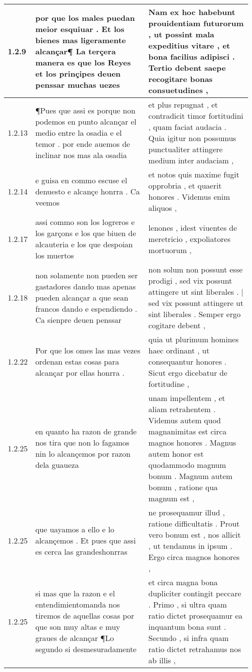 \begin{tabular}{|p{1cm}|p{6.5cm}|p{6.5cm}|}
1.2.9 & por que los males puedan meior esquiuar . Et los bienes mas ligeramente alcançar¶ La terçera manera es que los Reyes et los prinçipes deuen penssar muchas uezes & Nam ex hoc habebunt prouidentiam futurorum , ut possint mala expeditius vitare , et bona facilius adipisci . Tertio debent saepe recogitare bonas consuetudines , \\\hline
1.2.13 & ¶Pues que assi es porque non podemos en punto alcançar el medio entre la osadia e el temor . por ende auemos de inclinar nos mas ala osadia & et plus repugnat , et contradicit timor fortitudini , quam faciat audacia . Quia igitur non possumus punctualiter attingere medium inter audaciam , \\\hline
1.2.14 & e guisa en commo escuse el denuesto e alcançe honrra . Ca veemos & et notos quis maxime fugit opprobria , et quaerit honores . Videmus enim aliquos , \\\hline
1.2.17 & assi commo son los logreros e los garçons e los que biuen de alcauteria e los que despoian los muertos & lenones , idest viuentes de meretricio , expoliatores mortuorum , \\\hline
1.2.18 & non solamente non pueden ser gastadores dando mas apenas pueden alcançar a que sean francos dando e espendiendo . Ca sienpre deuen penssar & non solum non possunt esse prodigi , sed vix possunt attingere ut sint liberales . | sed vix possunt attingere ut sint liberales . Semper ergo cogitare debent , \\\hline
1.2.22 & Por que los omes las mas vezes ordenan estas cosas para alcançar por ellas honrra . & quia ut plurimum homines haec ordinant , ut consequantur honores . Sicut ergo dicebatur de fortitudine , \\\hline
1.2.25 & en quanto ha razon de grande nos tira que non lo fagamos nin lo alcançemos por razon dela guaueza & unam impellentem , et aliam retrahentem . Videmus autem quod magnanimitas est circa magnos honores . Magnus autem honor est quodammodo magnum bonum . Magnum autem bonum , ratione qua magnum est , \\\hline
1.2.25 & que uayamos a ello e lo alcançemos . Et pues que assi es cerca las grandeshonrras & ne prosequamur illud , ratione difficultatis . Prout vero bonum est , nos allicit , ut tendamus in ipsum . Ergo circa magnos honores , \\\hline
1.2.25 & si mas que la razon e el entendimientomanda nos tiremos de aquellas cosas por que son muy altas e muy graues de alcançar ¶Lo segundo si desmesuradamente & et circa magna bona dupliciter contingit peccare . Primo , si ultra quam ratio dictet prosequamur ea inquantum bona sunt . Secundo , si infra quam ratio dictet retrahamus nos ab illis , \\\hline

\end{tabular}
